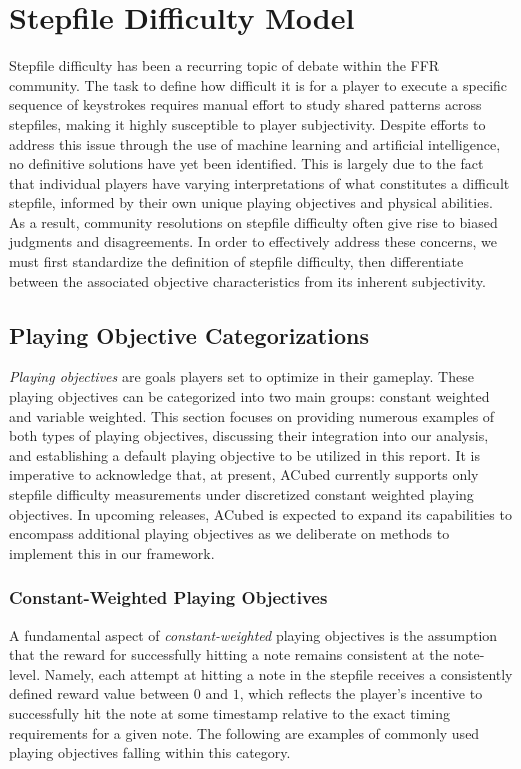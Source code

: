 \section{Stepfile Difficulty Model}
\label{sec:stepfile_difficulty}

Stepfile difficulty has been a recurring topic of debate within the FFR community. The task to define how difficult it is for a player to execute a specific sequence of keystrokes requires manual effort to study shared patterns across stepfiles, making it highly susceptible to player subjectivity. Despite efforts to address this issue through the use of machine learning and artificial intelligence, no definitive solutions have yet been identified. This is largely due to the fact that individual players have varying interpretations of what constitutes a difficult stepfile, informed by their own unique playing objectives and physical abilities. As a result, community resolutions on stepfile difficulty often give rise to biased judgments and disagreements. In order to effectively address these concerns, we must first standardize the definition of stepfile difficulty, then differentiate between the associated objective characteristics from its inherent subjectivity.

\subsection{Playing Objective Categorizations}

\textit{Playing objectives} are goals players set to optimize in their gameplay. These playing objectives can be categorized into two main groups: constant weighted and variable weighted. This section focuses on providing numerous examples of both types of playing objectives, discussing their integration into our analysis, and establishing a default playing objective to be utilized in this report. It is imperative to acknowledge that, at present, ACubed currently supports only stepfile difficulty measurements under discretized constant weighted playing objectives. In upcoming releases, ACubed is expected to expand its capabilities to encompass additional playing objectives as we deliberate on methods to implement this in our framework.

\subsubsection{Constant-Weighted Playing Objectives}

A fundamental aspect of \textit{constant-weighted} playing objectives is the assumption that the reward for successfully hitting a note remains consistent at the note-level. Namely, each attempt at hitting a note in the stepfile receives a consistently defined reward value between $0$ and $1$, which reflects the player's incentive to successfully hit the note at some timestamp relative to the exact timing requirements for a given note. The following are examples of commonly used playing objectives falling within this category.

